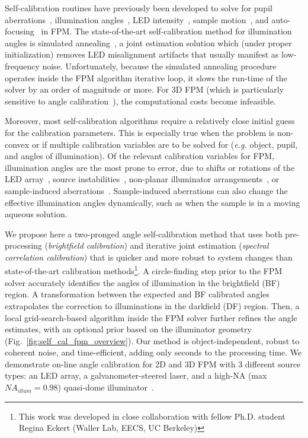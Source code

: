 Self-calibration routines have previously been developed to solve for pupil aberrations~\cite{Thibault2009,Ou:14,Horstmeyer:14}, illumination angles~\cite{Yeh2015,Sun:16LEDpos,Liu:17, maiden2012annealing, zhang2013translation}, LED intensity~\cite{Bian:13}, sample motion~\cite{Bian:16}, and auto-focusing~\cite{Dou2017} in FPM. The state-of-the-art self-calibration method for illumination angles is simulated annealing~\cite{Yeh2015,Sun:16LEDpos}, a joint estimation solution which (under proper initialization) removes LED misalignment artifacts that usually manifest as low-frequency noise. Unfortunately, because the simulated annealing procedure operates inside the FPM algorithm iterative loop, it slows the run-time of the solver by an order of magnitude or more. For 3D FPM (which is particularly sensitive to angle calibration~\cite{tian20153d}), the computational costs become infeasible. 

Moreover, most self-calibration algorithms require a relatively close initial guess for the calibration parameters. This is especially true when the problem is non-convex or if multiple calibration variables are to be solved for (\textit{e.g.} object, pupil, and angles of illumination). Of the relevant calibration variables for FPM, illumination angles are the most prone to error, due to shifts or rotations of the LED array~\cite{Guo:15}, source instabilities~\cite{Kuang:15,Eckert:16}, non-planar illuminator arrangements~\cite{Chung2016,phillips2015multi,Sen:16,Phillips:17}, or sample-induced aberrations~\cite{Hell:1993,Kang:18}. Sample-induced aberrations can also change the effective illumination angles dynamically, such as when the sample is in a moving aqueous solution. 

We propose here a two-pronged angle self-calibration method that uses both pre-processing (\textit{brightfield calibration}) and iterative joint estimation (\textit{spectral correlation calibration}) that is quicker and more robust to system changes than state-of-the-art calibration methods\footnote{This work was developed in close collaboration with fellow Ph.D. student Regina Eckert (Waller Lab, EECS, UC Berkeley)}. A circle-finding step prior to the FPM solver accurately identifies the angles of illumination in the brightfield (BF) region. A transformation between the expected and BF calibrated angles extrapolates the correction to illuminations in the darkfield (DF) region. Then, a local grid-search-based algorithm inside the FPM solver further refines the angle estimates, with an optional prior based on the illuminator geometry (Fig.~\ref{fig:self_cal_fpm_overview}). Our method is object-independent, robust to coherent noise, and time-efficient, adding only seconds to the processing time. We demonstrate on-line angle calibration for 2D and 3D FPM with 3 different source types: an LED array, a galvanometer-steered laser, and a high-NA (max $NA_{illum} = 0.98$) quasi-dome illuminator~\cite{Phillips:17}.

